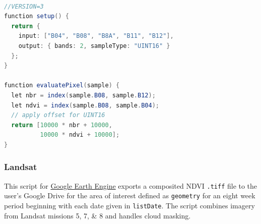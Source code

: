 \documentclass[
]{article}
\begin{document}
\begin{lstlisting}[language=Java]

//VERSION=3
function setup() {
  return {
    input: ["B04", "B08", "B8A", "B11", "B12"],
    output: { bands: 2, sampleType: "UINT16" }
  };
}

function evaluatePixel(sample) {
  let nbr = index(sample.B08, sample.B12);
  let ndvi = index(sample.B08, sample.B04);
  // apply offset for UINT16 
  return [10000 * nbr + 10000, 
          10000 * ndvi + 10000]; 
}
\end{lstlisting}

\clearpage

\subsubsection{Landsat}\label{landsat}

This script for \href{https://code.earthengine.google.com/}{Google Earth
Engine} exports a composited NDVI \texttt{.tiff} file to the user's
Google Drive for the area of interest defined as \texttt{geometry} for
an eight week period beginning with each date given in
\texttt{listDate}. The script combines imagery from Landsat missions 5,
7, \& 8 and handles cloud masking.
\end{document}
